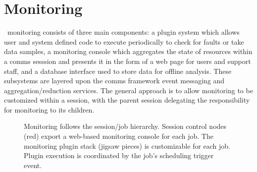 \section{Monitoring}

\ngrm\ monitoring consists of three main components:
a plugin system which allows user and system defined code to execute
periodically to check for faults or take data samples,
a monitoring console which aggregates the state of resources within a
comms sesssion and presents it in the form of a web page for users and
support staff, and a database interface used to store data for
offline analysis.
These subsystems are layered upon the comms framework event messaging and
aggregation/reduction services.  The general approach is to allow monitoring
to be customized within a session, with the parent session delegating
the responsibility for monitoring to its children.

\begin{figure}
\begin{minipage}[b]{0.4\linewidth}
\end{minipage}
\hspace{1cm}
\begin{minipage}[b]{0.4\linewidth}
\end{minipage}
\caption{Monitoring follows the session/job hierarchy.
Session control nodes (red) export a web-based monitoring console for each job.
The monitoring plugin stack (jigsaw pieces) is customizable for each job.
Plugin execution is coordinated by the job's scheduling trigger event.}
\label{FigMonEx1}
\end{figure}

